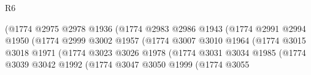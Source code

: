 \begin{lexlean}{R6}
\begin{coremodule}
                                              (@1774
                                                @2975
                                                @2978
                                                @1936
                                                (@1774
                                                  @2983
                                                  @2986
                                                  @1943
                                                  (@1774
                                                    @2991
                                                    @2994
                                                    @1950
                                                    (@1774
                                                      @2999
                                                      @3002
                                                      @1957
                                                      (@1774
                                                        @3007
                                                        @3010
                                                        @1964
                                                        (@1774
                                                          @3015
                                                          @3018
                                                          @1971
                                                          (@1774
                                                            @3023
                                                            @3026
                                                            @1978
                                                            (@1774
                                                              @3031
                                                              @3034
                                                              @1985
                                                              (@1774
                                                                @3039
                                                                @3042
                                                                @1992
                                                                (@1774
                                                                  @3047
                                                                  @3050
                                                                  @1999
                                                                  (@1774
                                                                    @3055

\end{coremodule}
\end{lexlean}
